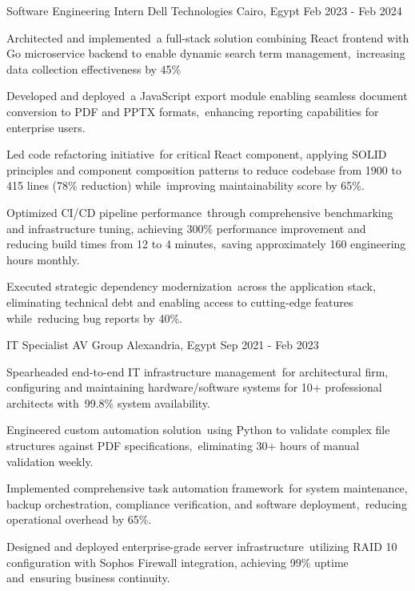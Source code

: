 \begin{cventries}

  \cventry
   {Software Engineering Intern} %
    {Dell Technologies} %
    {Cairo, Egypt} %
    {Feb 2023 - Feb 2024} %
    {
      \begin{cvitems} %
        \item {Architected and implemented a full-stack solution combining React frontend with Go microservice backend to enable dynamic search term management, increasing data collection effectiveness by 45\%}
        \item {Developed and deployed a JavaScript export module enabling seamless document conversion to PDF and PPTX formats, enhancing reporting capabilities for enterprise users.}
        \item {Led code refactoring initiative for critical React component, applying SOLID principles and component composition patterns to reduce codebase from 1900 to 415 lines (78\% reduction) while improving maintainability score by 65\%.}
        \item{Optimized CI/CD pipeline performance through comprehensive benchmarking and infrastructure tuning, achieving 300\% performance improvement and reducing build times from 12 to 4 minutes, saving approximately 160 engineering hours monthly.}
        \item{Executed strategic dependency modernization across the application stack, eliminating technical debt and enabling access to cutting-edge features while reducing bug reports by 40\%.}
      \end{cvitems}
    }
    
     \cventry
    {IT Specialist} %
    {AV Group} %
    {Alexandria, Egypt} %
    {Sep 2021 - Feb 2023} %
    {
      \begin{cvitems} %
      \item{Spearheaded end-to-end IT infrastructure management for architectural firm, configuring and maintaining hardware/software systems for 10+ professional architects with 99.8\% system availability.}
        \item {Engineered custom automation solution using Python to validate complex file structures against PDF specifications, eliminating 30+ hours of manual validation weekly.}
        \item {Implemented comprehensive task automation framework for system maintenance, backup orchestration, compliance verification, and software deployment, reducing operational overhead by 65\%.}
        \item {Designed and deployed enterprise-grade server infrastructure utilizing RAID 10 configuration with Sophos Firewall integration, achieving 99\% uptime and ensuring business continuity.}
      \end{cvitems}
    }
    

\end{cventries}
